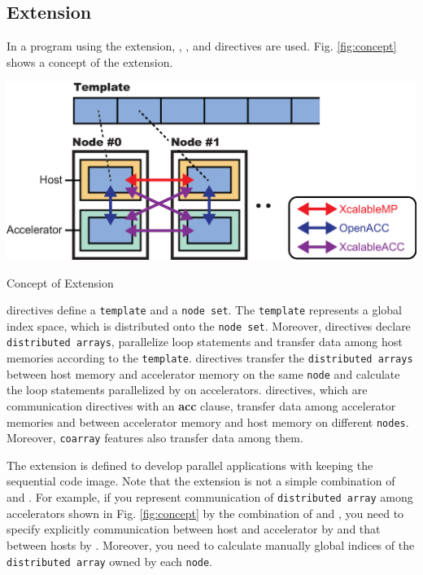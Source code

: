 \subsection{{\XMP} Extension}
In a program using the {\XMP} extension,
{\XMP}, {\OACC}, and {\XACC} directives are used.
Fig. \ref{fig:concept} shows a concept of the {\XMP} extension.

\begin{myfigure}
\includegraphics[scale=0.5,clip]{figs/concept.eps}
  \caption{Concept of {\XMP} Extension}\label{fig:concept}
\end{myfigure}

{\XMP} directives define a {\tt template} and a {\tt node set}.
The {\tt template} represents a global index space, which is distributed onto the {\tt node set}.
Moreover, {\XMP} directives declare {\tt distributed arrays},
parallelize loop statements and transfer data among host memories according to the {\tt template}.
{\OACC} directives transfer the {\tt distributed arrays} between host memory and accelerator memory on the same {\tt node}
and calculate the loop statements parallelized by {\XMP} on accelerators.
{\XACC} directives, which are {\XMP} communication directives with an {\bf acc} clause, 
transfer data among accelerator memories and between accelerator memory and host memory on different {\tt nodes}.
Moreover, 
{\tt coarray} features also transfer data among them.

The {\XMP} extension is defined to develop parallel applications with keeping the sequential code image.
Note that 
the {\XMP} extension is not a simple combination of {\XMP} and {\OACC}.
For example, 
if you represent communication of {\tt distributed array} among accelerators shown in Fig. \ref{fig:concept} by the combination of {\XMP} and {\OACC},
you need to specify explicitly communication between host and accelerator by {\OACC} and that between hosts by {\XMP}.
Moreover,
you need to calculate manually global indices of the {\tt distributed array} owned by each {\tt node}.

